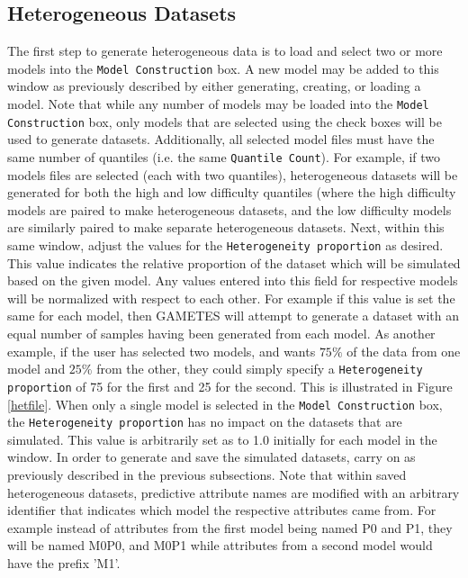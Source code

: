 \documentclass{report}
\begin{document}
\subsection{Heterogeneous Datasets}\label{hetdata}
The first step to generate heterogeneous data is to load and select two or more models into the \texttt{Model Construction} box.  A new model may be added to this window as previously described by either generating, creating, or loading a model.  Note that while any number of models may be loaded into the \texttt{Model Construction} box, only models that are selected using the check boxes will be used to generate datasets.  Additionally, all selected model files must have the same number of quantiles (i.e. the same \texttt{Quantile Count}).  For example, if two models files are selected (each with two quantiles), heterogeneous datasets will be generated for both the high and low difficulty quantiles (where the high difficulty models are paired to make heterogeneous datasets, and the low difficulty models are similarly paired to make separate heterogeneous datasets.  Next, within this same window, adjust the values for the \texttt{Heterogeneity proportion} as desired.  This value indicates the relative proportion of the dataset which will be simulated based on the given model.  Any values entered into this field for respective models will be normalized with respect to each other.  For example if this value is set the same for each model, then GAMETES will attempt to generate a dataset with an equal number of samples having been generated from each model.  As another example, if the user has selected two models, and wants $75\%$ of the data from one model and $25\%$ from the other, they could simply specify a \texttt{Heterogeneity proportion} of 75 for the first and 25 for the second.  This is illustrated in Figure \ref{hetfile}.  When only a single model is selected in the \texttt{Model Construction} box, the \texttt{Heterogeneity proportion} has no impact on the datasets that are simulated.  This value is arbitrarily set as to 1.0 initially for each model in the window.  In order to generate and save the simulated datasets, carry on as previously described in the previous subsections.  Note that within saved heterogeneous datasets, predictive attribute names are modified with an arbitrary identifier that indicates which model the respective attributes came from.  For example instead of attributes from the first model being named P0 and P1, they will be named M0P0, and M0P1 while attributes from a second model would have the prefix 'M1'.  
\end{document}

